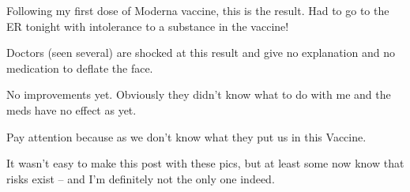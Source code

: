 Following my first dose of Moderna vaccine, this is the result. Had to go to the
ER tonight with intolerance to a substance in the vaccine!

Doctors (seen several) are shocked at this result and give no explanation and no
medication to deflate the face.

No improvements yet. Obviously they didn’t know what to do with me and the meds
have no effect as yet.

Pay attention because as we don’t know what they put us in this Vaccine.

It wasn’t easy to make this post with these pics, but at least some now know
that risks exist – and I’m definitely not the only one indeed.

